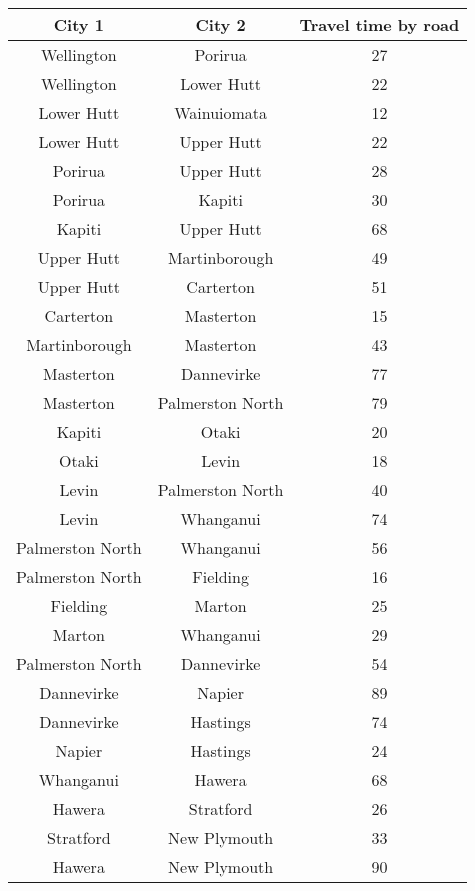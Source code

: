 \begin{center}
\begin{tabular}{|c|c|c|}\hline
  \textbf{City 1} & \textbf{City 2} & \textbf{Travel time by road}\\\hline
  Wellington & Porirua & 27\\
  Wellington & Lower Hutt & 22\\
  Lower Hutt & Wainuiomata & 12\\
  Lower Hutt & Upper Hutt & 22\\
  Porirua & Upper Hutt & 28\\
  Porirua & Kapiti & 30\\
  Kapiti & Upper Hutt & 68\\
  Upper Hutt & Martinborough & 49\\
  Upper Hutt & Carterton & 51\\
  Carterton & Masterton & 15\\
  Martinborough & Masterton & 43\\
  Masterton & Dannevirke & 77\\
  Masterton & Palmerston North & 79\\
  Kapiti & Otaki & 20\\
  Otaki & Levin & 18\\
  Levin & Palmerston North & 40\\
  Levin & Whanganui & 74\\
  Palmerston North & Whanganui & 56\\
  Palmerston North & Fielding & 16\\
  Fielding & Marton & 25\\
  Marton & Whanganui & 29\\
  Palmerston North & Dannevirke & 54\\
  Dannevirke & Napier & 89\\
  Dannevirke & Hastings & 74\\
  Napier & Hastings & 24\\
  Whanganui & Hawera & 68\\
  Hawera & Stratford & 26\\
  Stratford & New Plymouth & 33\\
  Hawera & New Plymouth & 90\\\hline
\end{tabular}
\end{center}

